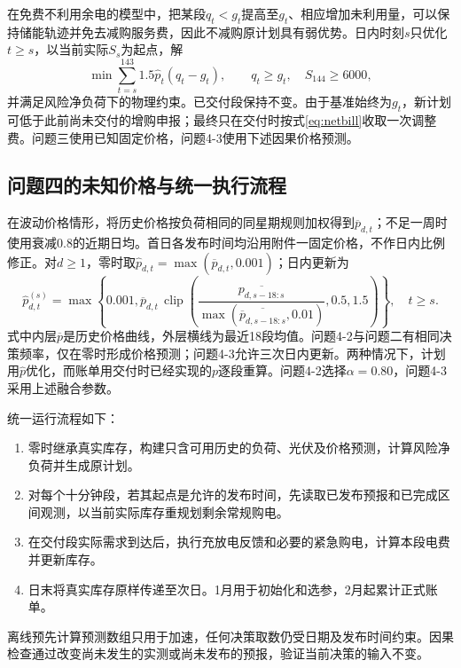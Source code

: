 在免费不利用余电的模型中，把某段$q_t<g_t$提高至$g_t$、相应增加未利用量，可以保持储能轨迹并免去减购服务费，因此不减购原计划具有弱优势。日内时刻$s$只优化$t\ge s$，以当前实际$S_s$为起点，解
\begin{equation}
 \min\sum_{t=s}^{143}1.5\widehat p_t(q_t-g_t),\qquad
 q_t\ge g_t,\quad S_{144}\ge6000,\label{eq:replan}
\end{equation}
并满足风险净负荷下的物理约束。已交付段保持不变。由于基准始终为$g_t$，新计划可低于此前尚未交付的增购申报；最终只在交付时按式\eqref{eq:netbill}收取一次调整费。问题三使用已知固定价格，问题4-3使用下述因果价格预测。

\subsection{问题四的未知价格与统一执行流程}
在波动价格情形，将历史价格按负荷相同的同星期规则加权得到$\overline p_{d,t}$；不足一周时使用衰减0.8的近期日均。首日各发布时间均沿用附件一固定价格，不作日内比例修正。对$d\ge1$，零时取$\widehat p_{d,t}=\max(\overline p_{d,t},0.001)$；日内更新为
\begin{equation}
 \widehat p^{(s)}_{d,t}=\max\left\{0.001,\overline p_{d,t}\,
 \operatorname{clip}\!\left(
 \frac{\overline{p_{d,s-18:s}}}{\max(\overline{\overline p_{d,s-18:s}},0.01)},0.5,1.5\right)\right\},\quad t\ge s.
\end{equation}
式中内层$\overline p$是历史价格曲线，外层横线为最近18段均值。问题4-2与问题二有相同决策频率，仅在零时形成价格预测；问题4-3允许三次日内更新。两种情况下，计划用$\widehat p$优化，而账单用交付时已经实现的$p$逐段重算。问题4-2选择$\alpha=0.80$，问题4-3采用上述融合参数。

统一运行流程如下：
\begin{enumerate}
 \item 零时继承真实库存，构建只含可用历史的负荷、光伏及价格预测，计算风险净负荷并生成原计划。
 \item 对每个十分钟段，若其起点是允许的发布时间，先读取已发布预报和已完成区间观测，以当前实际库存重规划剩余常规购电。
 \item 在交付段实际需求到达后，执行充放电反馈和必要的紧急购电，计算本段电费并更新库存。
 \item 日末将真实库存原样传递至次日。1月用于初始化和选参，2月起累计正式账单。
\end{enumerate}
离线预先计算预测数组只用于加速，任何决策取数仍受日期及发布时间约束。因果检查通过改变尚未发生的实测或尚未发布的预报，验证当前决策的输入不变。
\FloatBarrier
